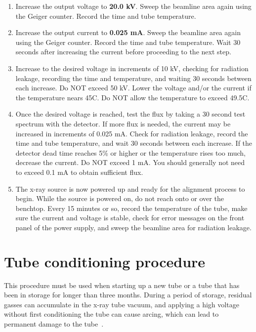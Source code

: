 \begin{enumerate}
\item Increase the output voltage to \textbf{20.0 kV}. Sweep the beamline area
  again using the Geiger counter. Record the time and tube temperature.

\item Increase the output current to \textbf{0.025 mA}. Sweep the beamline area
  again using the Geiger counter.  Record the time and tube temperature. Wait 30
  seconds after increasing the current before proceeding to the next step.

\item Increase to the desired voltage in increments of 10 kV, checking for
  radiation leakage, recording the time and temperature, and waiting 30 seconds
  between each increase. Do NOT exceed 50 kV.  Lower the voltage and/or the
  current if the temperature nears 45C. Do NOT allow the temperature to exceed
  49.5C.

\item Once the desired voltage is reached, test the flux by taking a 30 second
  test spectrum with the detector. If more flux is needed, the current may be
  increased in increments of 0.025 mA. Check for radiation leakage, record the
  time and tube temperature, and wait 30 seconds between each increase.  If the
  detector dead time reaches 5\% or higher or the temperature rises too much,
  decrease the current. Do NOT exceed 1 mA.  You should generally not need to
  exceed 0.1 mA to obtain sufficient flux.\label{item:finish}

\item The x-ray source is now powered up and ready for the alignment process to
  begin. While the source is powered on, do not reach onto or over the
  benchtop. Every 15 minutes or so, record the temperature of the tube, make
  sure the current and voltage is stable, check for error messages on the front
  panel of the power supply, and sweep the beamline area for radiation leakage.

\end{enumerate}

\section{Tube conditioning procedure\label{sec:conditioning}}

This procedure must be used when starting up a new tube or a tube that has been
in storage for longer than three months. During a period of storage, residual
gasses can accumulate in the x-ray tube vacuum, and applying a high voltage
without first conditioning the tube can cause arcing, which can lead to
permanent damage to the tube~\cite{tube_conditioning}.

